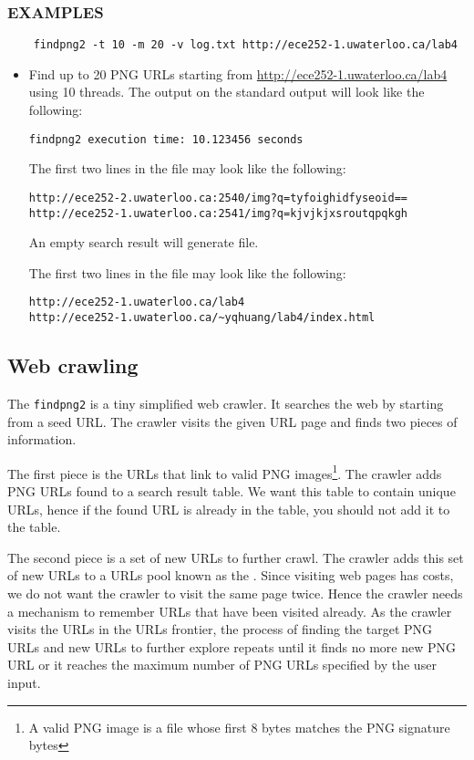 \subsubsection*{EXAMPLES}
\begin{verbatim}
    findpng2 -t 10 -m 20 -v log.txt http://ece252-1.uwaterloo.ca/lab4
\end{verbatim}
\begin{itemize}
\item[]Find up to 20 PNG URLs starting from \url{http://ece252-1.uwaterloo.ca/lab4} using 10 threads.
The output on the standard output will look like the following:
\begin{verbatim}
findpng2 execution time: 10.123456 seconds
\end{verbatim}
The first two lines in the  file may look like the following:
\begin{verbatim}
http://ece252-2.uwaterloo.ca:2540/img?q=tyfoighidfyseoid==
http://ece252-1.uwaterloo.ca:2541/img?q=kjvjkjxsroutqpqkgh
\end{verbatim}
An empty search result will generate  file.

The first two lines in the  file may look like the following:
\begin{verbatim}
http://ece252-1.uwaterloo.ca/lab4
http://ece252-1.uwaterloo.ca/~yqhuang/lab4/index.html
\end{verbatim}
\end{itemize}

\subsection{Web crawling}
The \verb+findpng2+ is a tiny simplified web crawler. It searches the web by starting from a seed URL. The crawler visits the given URL page and finds two pieces of information.

The first piece is the URLs that link to valid PNG images\footnote{A valid PNG image is a file whose first 8 bytes matches the PNG signature bytes}. The crawler adds PNG URLs found to a search result table. We want this table to contain unique URLs, hence if the found URL is already in the table, you should not add it to the table.

The second piece is a set of new URLs to further crawl. The crawler adds this set of new URLs to a URLs pool known as the . Since visiting web pages has costs, we do not want the crawler to visit the same page twice. Hence the crawler needs a mechanism to remember URLs that have been visited already. As the crawler visits the URLs in the URLs frontier, the process of finding the target PNG URLs and new URLs to further explore repeats until it finds no more new PNG URL or it reaches the maximum number of PNG URLs specified by the user input.

